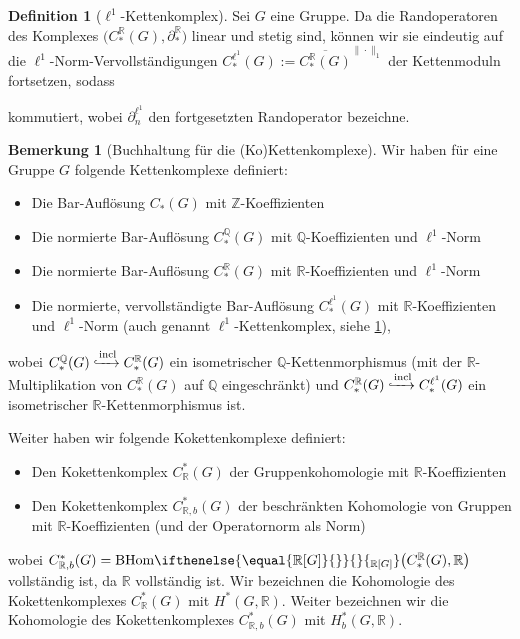 \documentclass[a4paper,twoside,10pt]{scrreprt}
\newcommand{\Z}{\mathbb{Z}}
\newcommand{\Q}{\mathbb{Q}}
\newcommand{\R}{\mathbb{R}}
\newcommand{\BHom}[2][]{\text{BHom}%
\ifthenelse{\equal{#1}{}}{}{_{#1}}%
\bigl(#2\bigr)}%
\theoremstyle{definition}
\newtheorem{definition}[satz]{Definition}
\newtheorem{bemerkung}[satz]{Bemerkung}
\begin{document}
\begin{definition}[$\ell^1$-Kettenkomplex]\label{def:Ell1ChainComplex}
Sei $G$ eine Gruppe. Da die Randoperatoren des Komplexes $\bigl(C_*^{\R}(G),\partial_*^{\R}\bigr)$ linear und stetig sind, können wir sie eindeutig auf die $\ell^1$-Norm-Vervollständigungen $C_*^{\ell^1}(G):=\overline{C_*^{\R}(G)}^{\|\cdot\|_1}$  der Kettenmoduln fortsetzen, sodass 
\begin{center}
\end{center}
kommutiert, wobei $\partial_n^{\ell^1}$ den fortgesetzten Randoperator bezeichne.
\end{definition}

\begin{bemerkung}[Buchhaltung für die (Ko)Kettenkomplexe]
Wir haben für eine Gruppe $G$ folgende Kettenkomplexe definiert:
\begin{itemize}
\item Die Bar-Auflösung $C_*(G)$ mit $\Z$-Koeffizienten 
\item Die normierte Bar-Auflösung $C_*^{\Q}(G)$ mit $\Q$-Koeffizienten und $\ell^1$-Norm
\item Die normierte Bar-Auflösung $C_*^{\R}(G)$ mit $\R$-Koeffizienten und $\ell^1$-Norm
\item Die normierte, vervollständigte Bar-Auflösung $C_*^{\ell^1}(G)$ mit $\R$-Koeffizienten und $\ell^1$-Norm (auch genannt $\ell^1$-Kettenkomplex, siehe \cref{def:Ell1ChainComplex}),
\end{itemize}
wobei $C_*^{\Q}(G)\xhookrightarrow{\text{incl}}C_*^{\R}(G)$ ein isometrischer $\Q$-Kettenmorphismus (mit der $\R$-Multipli\-kation von $C_*^{\R}(G)$ auf $\Q$ eingeschränkt) und $C_*^{\R}(G)\xhookrightarrow{\text{incl}}C_*^{\ell^1}(G)$ ein isometrischer $\R$-Ketten\-morphismus ist.\par
Weiter haben wir folgende Kokettenkomplexe definiert:
\begin{itemize}
\item Den Kokettenkomplex $C_{\R}^*(G)$ der Gruppenkohomologie mit $\R$-Koeffizienten
\item  Den Kokettenkomplex $C_{\R,b}^*(G)$ der beschränkten Kohomologie von Gruppen mit $\R$-Koef\-fizienten (und der Operatornorm als Norm)
\end{itemize}
wobei $C_{\R,b}^*(G)=\BHom[\R{[}G{]}]{C_*^{\R}(G),\R}$ vollständig ist, da $\R$ vollständig ist. Wir bezeichnen die Kohomologie des Kokettenkomplexes $C_{\R}^*(G)$ mit $H^*(G,\R)$. Weiter bezeichnen wir die Kohomologie des Kokettenkomplexes $C_{\R,b}^*(G)$ mit $H_b^*(G,\R)$.
\end{bemerkung}
\end{document}
